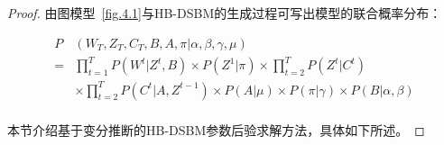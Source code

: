 \begin{proof}
	
	由图模型~\ref{fig.4.1}与HB-DSBM的生成过程可写出模型的联合概率分布：
	
	\begin{equation}
		\begin{split}
			P&(W_T, Z_T, C_T, B, A, \pi | \alpha, \beta, \gamma, \mu) \\
			= & \prod_{t=1}^T P(W^t | Z^t, B) \times  P(Z^1 | \pi) \times \prod_{t=2}^T P(Z^t | C^t) \\
			& \times \prod_{t=2}^T P(C^t | A, Z^{t-1}) \times P(A | \mu) \times P(\pi | \gamma) \times P(B | \alpha, \beta) \\
		\end{split}
	\end{equation}
	
	
	
	
	
	
	本节介绍基于变分推断的HB-DSBM参数后验求解方法，具体如下所述。
	

\end{proof}
